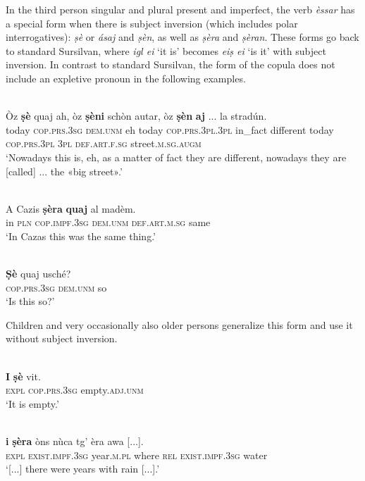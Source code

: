 In the third person singular and plural present and imperfect, the verb \textit{èssar} has a special form when there is subject inversion (which includes polar interrogatives): \textit{ṣè} or \textit{ásaj} and \textit{ṣèn}, as well as \textit{ṣèra} and \textit{ṣèran}. These forms go back to standard Sursilvan, where \textit{igl ei} `it is' becomes \textit{eiṣ ei} `is it' with subject inversion. In contrast to standard Sursilvan, the form of the copula does not include an expletive pronoun in the following examples.

\ea
\label{}
\\
\gll    Òz \textbf{ṣè} quaj ah, òz \textbf{ṣèni} schòn autar, òz \textbf{ṣèn} \textbf{aj} ... la stradún. \\
today \textsc{cop.prs.3sg} \textsc{dem.unm} eh today \textsc{cop.prs.3pl.3pl} in\_fact different today \textsc{cop.prs.3pl} \textsc{3pl} {} \textsc{def.art.f.sg} street.\textsc{m.sg.augm} \\
\glt `Nowadays this is, eh, as a matter of fact they are different, nowadays they are [called] ... the «big street».'
\z

\ea
\label{}
\\
\gll    A Cazis \textbf{ṣèra} \textbf{quaj} al madèm.\\
in \textsc{pln} \textsc{cop.impf.3sg} \textsc{dem.unm} \textsc{def.art.m.sg} same\\
\glt `In Cazas this was the same thing.'
\z

\ea
\label{}
\\
\gll \textbf{Ṣè} quaj usché?\\
\textsc{cop.prs.3sg} \textsc{dem.unm} so\\
\glt `Is this so?'
\z

Children and very occasionally also older persons generalize this form and use it without subject inversion.

\ea
\label{}
\\
\gll \textbf{I} \textbf{ṣè} vit.\\
\textsc{expl} \textsc{cop.prs.3sg} empty.\textsc{adj.unm}\\
\glt `It is empty.'
\z

\ea
\label{}
\\
\gll [...] \textbf{i} \textbf{ṣèra} òns nùca tg’ èra awa [...].\\
{} \textsc{expl} \textsc{exist.impf.3sg} year.\textsc{m.pl} where \textsc{rel} \textsc{exist.impf.3sg} water \\
\glt `[...] there were years with rain [...].'
\z

